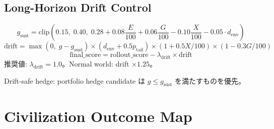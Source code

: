 \documentclass[11pt,a4paper]{article}
\theoremstyle{definition}\newtheorem{definition}{Definition}[section]
\begin{document}
\subsection{Long-Horizon Drift Control}
\begin{equation}
\boxed{g_\text{sust} = \text{clip}\left(0.15,\; 0.40,\; 0.28 + 0.08\frac{E}{100} + 0.06\frac{G}{100} - 0.10\frac{X}{100} - 0.05 \cdot d_\text{env}\right)}
\end{equation}
\begin{equation}
\boxed{\text{drift} = \max(0,\; g - g_\text{sust}) \times (d_\text{env} + 0.5 p_\text{tail}) \times (1 + 0.5 X/100) \times (1 - 0.3 G/100)}
\end{equation}
\begin{equation}
\boxed{\text{final\_score} = \text{rollout\_score} - \lambda_\text{drift} \times \text{drift}}
\end{equation}
推奨値: $\lambda_\text{drift} = 1.0$。Normal world: drift $\times 1.25$。

Drift-safe hedge: portfolio hedge candidate は $g \leq g_\text{sust}$ を満たすものを優先。


\section{Civilization Outcome Map}

\begin{center}
\end{center}


\end{document}
